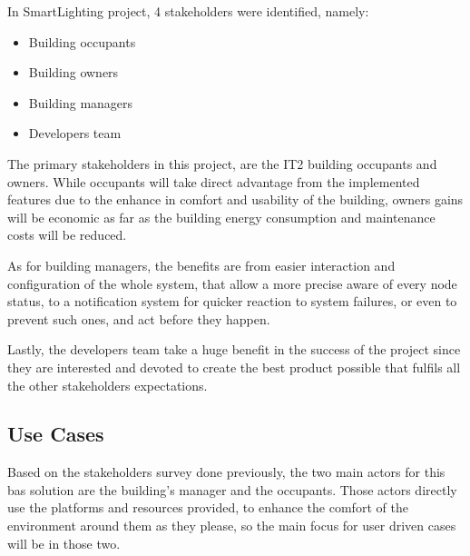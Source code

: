 In SmartLighting project, 4 stakeholders were identified, namely:

\begin{itemize}
	\item Building occupants
	\item Building owners
	\item Building managers
	\item Developers team
\end{itemize}


The primary stakeholders in this project, are the IT2 building occupants and owners. While occupants will take direct advantage from the implemented features due to the enhance in comfort and usability of the building, owners gains will be economic as far as the building energy consumption and maintenance costs will be reduced.

As for building managers, the benefits are from easier interaction and configuration of the whole system, that allow a more precise aware of every node status, to a notification system for quicker reaction to system failures, or even to prevent such ones, and act before they happen.

Lastly, the developers team take a huge benefit in the success of the project since they are interested and devoted to create the best product possible that fulfils all the other stakeholders expectations.


\subsection{Use Cases}
\label{Architecture:SLusecases}

Based on the stakeholders survey done previously, the two main actors for this \ac{bas} solution are the building's manager and the occupants. Those actors directly use the platforms and resources provided, to enhance the comfort of the environment around them as they please, so the main focus for user driven cases will be in those two. 


